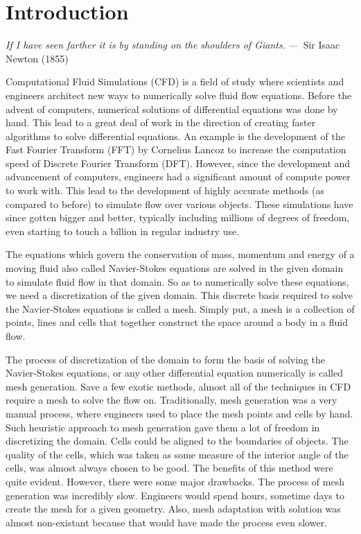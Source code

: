 
\chapter{Introduction}
\label{ch:Introduction}

\begin{epigraph}
    \emph{If I have seen farther it is by standing on the shoulders of
    Giants.} ---~Sir Isaac Newton (1855)
\end{epigraph}

Computational Fluid Simulations (CFD) is a field of study where scientists and engineers architect new ways to numerically solve fluid flow equations. Before the advent of computers, numerical solutions of differential equations was done by hand. This lead to a great deal of work in the direction of creating faster algorithms to solve differential equations. An example is the development of the Fast Fourier Transform (FFT) by Cornelius Lancoz to increase the computation speed of Discrete Fourier Transform (DFT). However, since the development and advancement of computers, engineers had a significant amount of compute power to work with. This lead to the development of highly accurate methods (as compared to before) to simulate flow over various objects. These simulations have since gotten bigger and better, typically including millions of degrees of freedom, even starting to touch a billion in regular industry use.

The equations which govern the conservation of mass, momentum and energy of a moving fluid also called Navier-Stokes equations are solved in the given domain to simulate fluid flow in that domain. So as to numerically solve these equations, we need a discretization of the given domain. This discrete basis required to solve the Navier-Stokes equations is called a mesh. Simply put, a mesh is a collection of points, lines and cells that together construct the space around a body in a fluid flow.

The process of discretization of the domain to form the basis of solving the Navier-Stokes equations, or any other differential equation numerically is called mesh generation. Save a few exotic methods, almost all of the techniques in CFD require a mesh to solve the flow on. Traditionally, mesh generation was a very manual process, where engineers used to place the mesh points and cells by hand. Such heuristic approach to mesh generation gave them a lot of freedom in discretizing the domain. Cells could be aligned to the boundaries of objects. The quality of the cells, which was taken as some measure of the interior angle of the cells, was almost always chosen to be good. The benefits of this method were quite evident. However, there were some major drawbacks. The process of mesh generation was incredibly slow. Engineers would spend hours, sometime days to create the mesh for a given geometry. Also, mesh adaptation with solution was almost non-existant because that would have made the process even slower.

